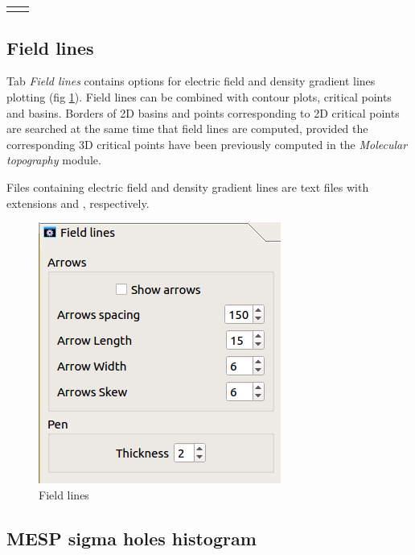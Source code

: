 \documentclass[10pt]{article}
\begin{document}
\begin{tabular}{lr}
\begin{minipage}{.5\linewidth}
\end{minipage}
\end{tabular}

\subsection{Field lines \label{sec:3.2}}

\begin{minipage}{0.5\linewidth}
 
Tab {\it Field lines} contains options for
electric field and density gradient lines plotting (fig \ref{fig:3_5}). 
Field lines can be combined with contour plots, 
critical points and basins. Borders of 2D basins and points corresponding to 2D 
critical points are searched at the same time that field lines are computed, provided the corresponding 
3D critical points have been previously computed in the {\it Molecular topography} module.

Files containing electric field and density gradient lines are text files with extensions \camdosD{}
and \dengrdosD, respectively.

\end{minipage}
\begin{minipage}{0.49\linewidth}
 \begin{figure}[H]
    \begin{center}
        \vspace*{1mm}
        \includegraphics[width=.4\linewidth]{damqt_fig_3_5.png}
    \end{center}
    \vspace*{1mm}
    \caption{Field lines \label{fig:3_5}}
\end{figure}
\end{minipage}

\subsection{MESP sigma holes histogram \label{sec:3.3}}
\end{document}
